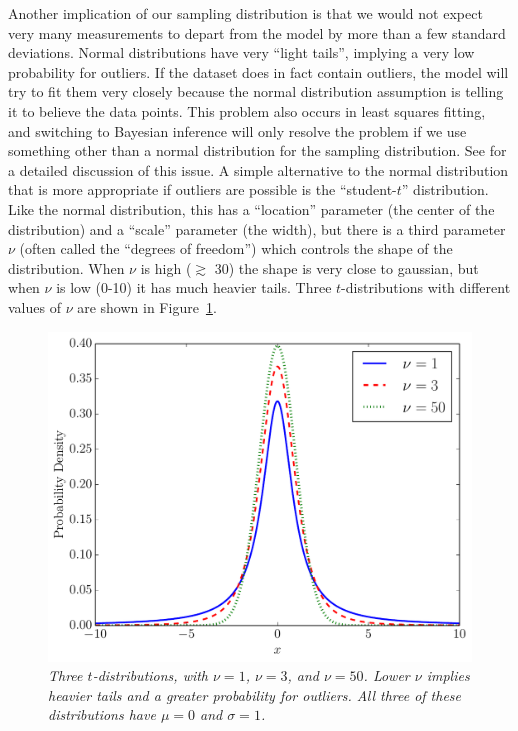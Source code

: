Another implication of our sampling distribution is that we would not expect
very many measurements to depart from the model by more than a few standard
deviations. Normal distributions have very ``light tails'', implying a very
low probability for outliers. If the dataset does in fact contain outliers,
the model will try to fit them very closely because the normal distribution
assumption is telling it to believe the data points. This problem also occurs
in least squares fitting, and switching to Bayesian inference will only resolve
the problem if we use something other than a normal distribution for the
sampling distribution. See \citet{hoggline} for a detailed discussion of this
issue. A simple alternative to the normal distribution that is more appropriate
if outliers are possible is the ``student-$t$'' distribution. Like the normal
distribution, this has a ``location'' parameter (the center of the distribution)
and a ``scale'' parameter (the width), but there is a third parameter $\nu$
(often called the ``degrees of freedom'')
which controls the shape of the distribution. When $\nu$ is high ($\gtrsim$ 30)
the shape is very close to gaussian, but when $\nu$ is low (0-10) it has much
heavier tails.  Three
$t$-distributions with different values of $\nu$ are shown in
Figure~\ref{fig:tdist}.

\begin{figure}
\begin{center}
\includegraphics[scale=0.45]{tdist.pdf}
\caption{\it Three $t$-distributions, with $\nu=1$, $\nu=3$, and $\nu=50$. Lower
$\nu$ implies heavier tails and a greater probability for outliers. All three
of these distributions have $\mu=0$ and $\sigma=1$.
\label{fig:tdist}}
\end{center}
\end{figure}

